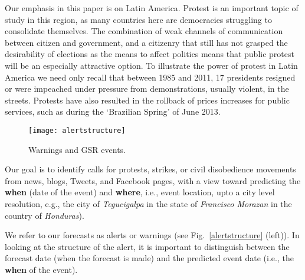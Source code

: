Our emphasis in this paper is on Latin America.
Protest is an important topic of study in this
region, as many countries here are democracies struggling to consolidate themselves.
The combination of weak channels of communication between citizen and government, and a citizenry that still 
has not grasped the desirability of elections as the means to affect politics means that public protest 
will be an especially attractive option. To illustrate the power of protest in Latin America we need 
only recall that between 1985 and 2011, 17 presidents resigned or were impeached under pressure from 
demonstrations, usually violent, in the streets. Protests have also resulted 
in the rollback of prices increases for public services, such as during the `Brazilian Spring' of June 2013.

\begin{figure}
    \texttt{[image: alertstructure]}
    \caption{Warnings and GSR events. }
    \label{fig:alertstructure}
\end{figure}

Our goal is to identify calls for protests, strikes, or civil disobedience movements from news, blogs, Tweets, and Facebook
pages, with a view toward predicting the {\bf when} (date of the event) and {\bf where}, i.e.,
event location, upto a city level resolution, e.g., 
the city of {\it Tegucigalpa} in the state of {\it Francisco Morazan} in the country of {\it Honduras}).
\iffalse
In addition we seek to forecast the `why' and `who' of the protest.
The {\bf why} (or event type)
captures the main objective or reason for a civil unrest event,
and is meant to come from 7 broad classes (e.g., `Employment \& Wages',
`Housing', `Energy \& Resources' etc.) each of which is further categorized into
whether the event is forecast to be violent or not.
Finally, the {\bf who} (or population)
denotes common categories of human populations
used in event coding~\cite{philschrodt}
such as
Business, Ethnic, Legal (e.g. judges or lawyers), Education (e.g. teachers or students or parents of students), Religious (e.g. clergy), Medical (e.g., doctors or nurses), Media, Labor, Refugees/Displaced, Agricultural (e.g. farmers,
or just General Population. 
\fi
We refer to our forecasts as alerts or warnings (see Fig.~\ref{alertstructure} (left)).
In looking at the structure of the alert, it is important to distinguish between the forecast date (when the forecast is made)
and the predicted event date (i.e., the {\bf when} of the event).

